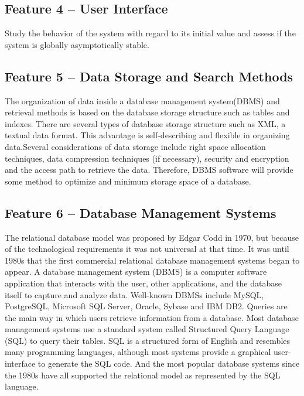 \documentclass[a4paper]{article} %
\begin{document}
	\subsection*{Feature 4 -- User Interface}
	\label{task1:feature4}
	
	Study the behavior of the system with regard to its initial value and assess if the system is globally asymptotically stable.
	
	\subsection*{Feature 5 -- Data Storage and Search Methods}
	\label{task1:feature5}
	
	The organization of data inside a database management system(DBMS) and retrieval methods is based on the database storage structure such as tables and indexes. 
	There are several types of database storage structure such as XML, a textual data format. 
	This advantage is self-describing and flexible in organizing data.\cite{ISI:000253400700005}Several considerations of data storage include right space allocation techniques, data compression techniques (if necessary), security and encryption and the access path to retrieve the data. 
	Therefore, DBMS software will provide some method to optimize and  minimum storage space of a database.
	
	\subsection*{Feature 6 -- Database Management Systems}
	\label{task1:feature6}
	
	The relational database model was proposed by Edgar Codd in 1970, but because of the technological requirements it was not universal at that time. It was until 1980s that the first commercial relational database management systems began to appear. 
	A database management system (DBMS) is a computer software application that interacts with the user, other applications, and the database itself to capture and analyze data. Well-known DBMSs include MySQL, PostgreSQL, Microsoft SQL Server, Oracle, Sybase and IBM DB2. 
	Queries are the main way in which users retrieve information from a database. Most database management systems use a standard system called Structured Query Language (SQL) to query their tables. SQL is a structured form of English and resembles many programming languages, although most systems provide a graphical user-interface to generate the SQL code. And the most popular database systems since the 1980s have all supported the relational model as represented by the SQL language.\cite{Martinez-Cruz2011}
	
\end{document}
